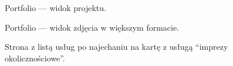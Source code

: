\documentclass[a4paper, 12pt]{article}
\numberwithin{figure}{section}
\begin{document}
\begin{sloppypar}
\begin{figure}[H] 
    \centering
   \caption{Portfolio --- widok projektu.}
   \label{fig:gotowa-aplikacja-3.jpg}
\end{figure}

\begin{figure}[H] 
    \centering
   \caption{Portfolio --- widok zdjęcia w większym formacie.}
   \label{fig:gotowa-aplikacja-4.jpg}
\end{figure}

\begin{figure}[H] 
    \centering
   \caption{Strona z listą usług po najechaniu na kartę z usługą ``imprezy okolicznościowe''.}
   \label{fig:gotowa-aplikacja-5.jpg}
\end{figure}


\end{sloppypar}
\end{document}
